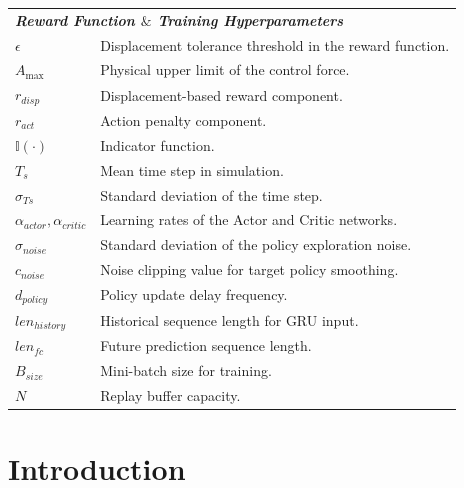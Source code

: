 \documentclass[review]{elsarticle}
\begin{document}
\begin{longtable}{@{}p{2.5cm} p{12.5cm}@{}}
\multicolumn{2}{l}{\textbf{\textit{Reward Function $\&$ Training Hyperparameters}}} \\
$\epsilon$ & Displacement tolerance threshold in the reward function. \\
$A_{\max}$ & Physical upper limit of the control force. \\
$r_{disp}$ & Displacement-based reward component. \\
$r_{act}$ & Action penalty component. \\
$\mathbb{I}(\cdot)$ & Indicator function. \\
$T_s$ & Mean time step in simulation. \\
$\sigma_{Ts}$ & Standard deviation of the time step. \\
$\alpha_{actor}, \alpha_{critic}$ & Learning rates of the Actor and Critic networks. \\
$\sigma_{noise}$ & Standard deviation of the policy exploration noise. \\
$c_{noise}$ & Noise clipping value for target policy smoothing. \\
$d_{policy}$ & Policy update delay frequency. \\
$len_{history}$ & Historical sequence length for GRU input. \\
$len_{fc}$ & Future prediction sequence length. \\
$B_{size}$ & Mini-batch size for training. \\
$N$ & Replay buffer capacity. \\
\end{longtable}

\setcounter{table}{0}

\section{Introduction}
\label{sec:introduction}
\end{document}
